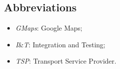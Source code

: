 \subsection{Abbreviations}
	\begin{itemize}
	\item \textit{GMaps}: Google Maps;
	\item \textit{I}\&\textit{T}: Integration and Testing;
   	\item \textit{TSP}: Transport Service Provider. 
	\end{itemize}